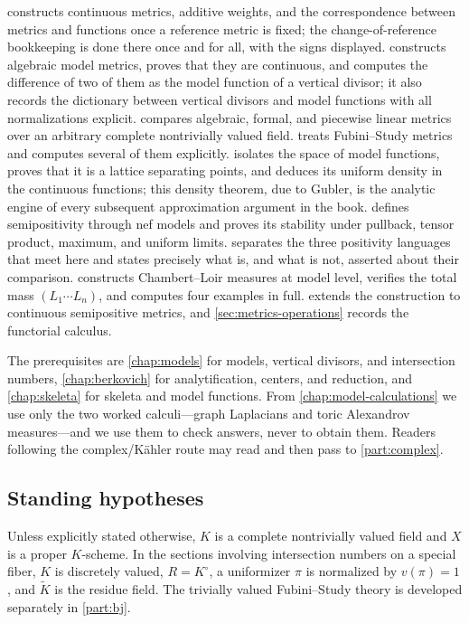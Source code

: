  constructs continuous metrics, additive
weights, and the correspondence between metrics and functions once a
reference metric is fixed; the change-of-reference bookkeeping is done there
once and for all, with the signs displayed.
 constructs algebraic model metrics, proves that
they are continuous, and computes the difference of two of them as the model
function of a vertical divisor; it also records the dictionary between
vertical divisors and model functions with all normalizations explicit.
 compares algebraic, formal, and piecewise
linear metrics over an arbitrary complete nontrivially valued field.
 treats Fubini--Study metrics and computes several of
them explicitly.
 isolates the space of model functions,
proves that it is a lattice separating points, and deduces its uniform
density in the continuous functions; this density theorem, due to Gubler, is
the analytic engine of every subsequent approximation argument in the book.
 defines semipositivity through nef models
and proves its stability under pullback, tensor product, maximum, and
uniform limits.
 separates the three positivity
languages that meet here and states precisely what is, and what is not,
asserted about their comparison.
 constructs Chambert--Loir measures at model
level, verifies the total mass $(L_1\cdots L_n)$, and computes four
examples in full.
 extends the construction to continuous
semipositive metrics, and \cref{sec:metrics-operations} records the
functorial calculus.

The prerequisites are \cref{chap:models} for models, vertical divisors, and
intersection numbers, \cref{chap:berkovich} for analytification, centers,
and reduction, and \cref{chap:skeleta} for skeleta and model functions. From
\cref{chap:model-calculations} we use only the two worked calculi---graph
Laplacians and toric Alexandrov measures---and we use them to check answers,
never to obtain them. Readers following the complex/Kähler route may read
 and then pass to
\cref{part:complex}.

\subsection*{Standing hypotheses}

Unless explicitly stated otherwise, $K$ is a complete nontrivially valued
field and $X$ is a proper $K$-scheme. In the sections involving
intersection numbers on a special fiber, $K$ is discretely valued,
$R=K^\circ$, a uniformizer $\pi$ is normalized by $v(\pi)=1$, and
$\widetilde K$ is the residue field. The trivially valued Fubini--Study
theory is developed separately in \cref{part:bj}.

